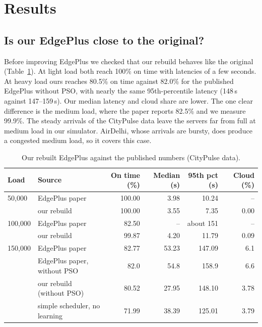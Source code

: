 \documentclass[11pt]{article}
\newcommand{\botrule}{\bottomrule}
\theoremstyle{definition}
\begin{document}
\section{Results}
\label{sec:results}

\subsection{Is our EdgePlus close to the original?}
Before improving EdgePlus we checked that our rebuild behaves like the original (Table~\ref{tab:fidelity}). At
light load both reach 100\% on time with latencies of a few seconds. At heavy load ours reaches 80.5\% on time
against 82.0\% for the published EdgePlus without PSO, with nearly the same 95th-percentile latency (148\,s
against 147--159\,s). Our median latency and cloud share are lower. The one clear difference is the medium load,
where the paper reports 82.5\% and we measure 99.9\%. The steady arrivals of the CityPulse data leave the servers
far from full at medium load in our simulator. AirDelhi, whose arrivals are bursty, does produce a congested
medium load, so it covers this case.

\begin{table}[!htbp]
\caption{Our rebuilt EdgePlus against the published numbers (CityPulse data).}
\label{tab:fidelity}
\footnotesize
\begin{tabular*}{\textwidth}{@{\extracolsep\fill}llrrrr@{}}
\toprule
Load & Source & On time (\%) & Median (s) & 95th pct (s) & Cloud (\%)\\
\midrule
50{,}000 & EdgePlus paper & 100.00 & 3.98 & 10.24 & --\\
 & our rebuild & 100.00 & 3.55 & 7.35 & 0.00\\
\midrule
100{,}000 & EdgePlus paper & 82.50 & -- & about 151 & --\\
 & our rebuild & 99.87 & 4.20 & 11.79 & 0.09\\
\midrule
150{,}000 & EdgePlus paper & 82.77 & 53.23 & 147.09 & 6.1\\
 & EdgePlus paper, without PSO & 82.0 & 54.8 & 158.9 & 6.6\\
 & our rebuild (without PSO) & 80.52 & 27.95 & 148.10 & 3.78\\
 & simple scheduler, no learning & 71.99 & 38.39 & 125.01 & 3.79\\
\botrule
\end{tabular*}
\end{table}
\end{document}
